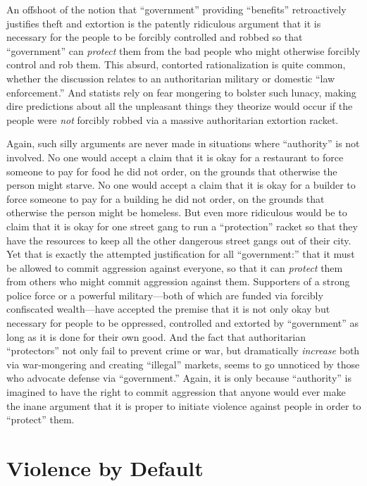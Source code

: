 \documentclass{book}
\begin{document}
An offshoot of the notion that \enquote{government} providing \enquote{benefits} retroactively justifies theft and extortion is the patently ridiculous argument that it is necessary for the people to be forcibly controlled and robbed so that \enquote{government} can \emph{protect} them from the bad people who might otherwise forcibly control and rob them. This absurd, contorted rationalization is quite common, whether the discussion relates to an authoritarian military or domestic \enquote{law enforcement.} And statists rely on fear mongering to bolster such lunacy, making dire predictions about all the unpleasant things they theorize would occur if the people were \emph{not} forcibly robbed via a massive authoritarian extortion racket.

Again, such silly arguments are never made in situations where \enquote{authority} is not involved. No one would accept a claim that it is okay for a restaurant to force someone to pay for food he did not order, on the grounds that otherwise the person might starve. No one would accept a claim that it is okay for a builder to force someone to pay for a building he did not order, on the grounds that otherwise the person might be homeless. But even more ridiculous would be to claim that it is okay for one street gang to run a \enquote{protection} racket so that they have the resources to keep all the other dangerous street gangs out of their city. Yet that is exactly the attempted justification for all \enquote{government:} that it must be allowed to commit aggression against everyone, so that it can \emph{protect} them from others who might commit aggression against them. Supporters of a strong police force or a powerful military---both of which are funded via forcibly confiscated wealth---have accepted the premise that it is not only okay but necessary for people to be oppressed, controlled and extorted by \enquote{government} as long as it is done for their own good. And the fact that authoritarian \enquote{protectors} not only fail to prevent crime or war, but dramatically \emph{increase} both via war-mongering and creating \enquote{illegal} markets, seems to go unnoticed by those who advocate defense via \enquote{government.} Again, it is only because \enquote{authority} is imagined to have the right to commit aggression that anyone would ever make the inane argument that it is proper to initiate violence against people in order to \enquote{protect} them.

\section{Violence by Default}
\end{document}

